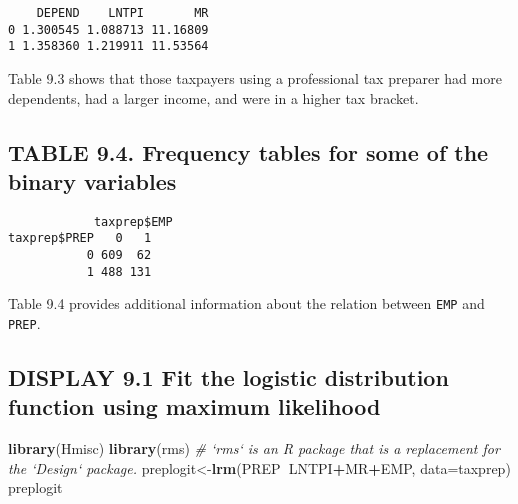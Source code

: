\documentclass[]{book}
\newenvironment{Shaded}{\begin{snugshade}}{\end{snugshade}}
\newcommand{\CommentTok}[1]{\textcolor[rgb]{0.56,0.35,0.01}{\textit{#1}}}
\newcommand{\DataTypeTok}[1]{\textcolor[rgb]{0.13,0.29,0.53}{#1}}
\newcommand{\KeywordTok}[1]{\textcolor[rgb]{0.13,0.29,0.53}{\textbf{#1}}}
\newcommand{\NormalTok}[1]{#1}
\newcommand{\OperatorTok}[1]{\textcolor[rgb]{0.81,0.36,0.00}{\textbf{#1}}}
\begin{document}
\begin{verbatim}
    DEPEND    LNTPI       MR
0 1.300545 1.088713 11.16809
1 1.358360 1.219911 11.53564
\end{verbatim}

Table 9.3 shows that those taxpayers using a professional tax preparer had more dependents, had a larger income, and were in a higher tax bracket.

\hypertarget{table-9.4.-frequency-tables-for-some-of-the-binary-variables}{%
\subsection{TABLE 9.4. Frequency tables for some of the binary variables}\label{table-9.4.-frequency-tables-for-some-of-the-binary-variables}}

\begin{Shaded}
\end{Shaded}

\begin{verbatim}
            taxprep$EMP
taxprep$PREP   0   1
           0 609  62
           1 488 131
\end{verbatim}

Table 9.4 provides additional information about the relation between \texttt{EMP} and \texttt{PREP}.

\hypertarget{display-9.1-fit-the-logistic-distribution-function-using-maximum-likelihood}{%
\subsection{DISPLAY 9.1 Fit the logistic distribution function using maximum likelihood}\label{display-9.1-fit-the-logistic-distribution-function-using-maximum-likelihood}}

\begin{Shaded}
\begin{Highlighting}[]
\KeywordTok{library}\NormalTok{(Hmisc)}
\KeywordTok{library}\NormalTok{(rms)}
\CommentTok{# `rms` is an R package that is a replacement for the `Design` package.}
\NormalTok{preplogit<-}\KeywordTok{lrm}\NormalTok{(PREP}\OperatorTok{~}\NormalTok{LNTPI}\OperatorTok{+}\NormalTok{MR}\OperatorTok{+}\NormalTok{EMP, }\DataTypeTok{data=}\NormalTok{taxprep) }
\NormalTok{preplogit}
\end{Highlighting}
\end{Shaded}
\end{document}
